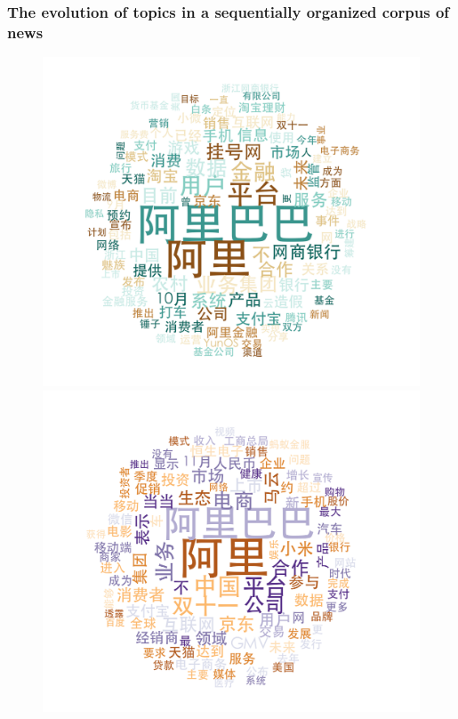 \documentclass{beamer}
\begin{document}
\begin{frame}
  \frametitle{The evolution of topics in a sequentially organized
    corpus of news}
  \begin{figure}
    \centering
    \includegraphics[height=0.3\textheight]{plot/Sep-Oct-wordcloud.png}    \includegraphics[height=0.3\textheight]{plot/Nov-wordcloud.png}

\end{figure}
\end{frame}
\end{document}

